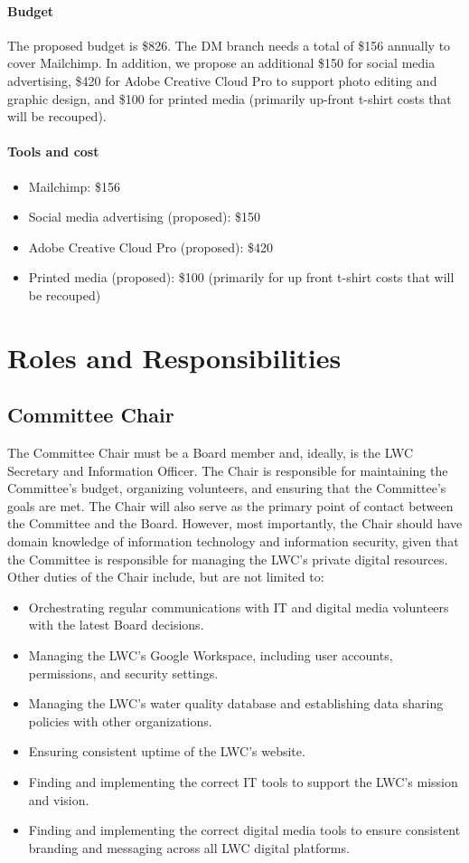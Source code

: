 \documentclass[letterpaper,11pt,leqno]{article}
\begin{document}
\paragraph{Budget} The proposed budget is \$826. The DM branch needs a total of \$156 annually to cover Mailchimp. In addition, we propose an additional \$150 for social media advertising,
\$420 for Adobe Creative Cloud Pro to support photo editing and graphic design, and \$100 for printed media (primarily up-front t-shirt costs that will be recouped).
\paragraph{Tools and cost}
\begin{itemize}
    \item Mailchimp: \$156
    \item Social media advertising (proposed): \$150
    \item Adobe Creative Cloud Pro (proposed): \$420
    \item Printed media (proposed): \$100 (primarily for up front t-shirt costs that will be recouped)
\end{itemize}

\section{Roles and Responsibilities}\label{s:roles}

\subsection{Committee Chair}\label{s:chair}

The Committee Chair must be a Board member and, ideally, is the LWC Secretary and Information Officer. The Chair is responsible for maintaining the Committee's budget, organizing volunteers, and ensuring that the Committee's goals are met. The Chair will also serve as the primary point of contact between the Committee and the Board. However,
most importantly, the Chair should have domain knowledge of information technology and information security, given that the Committee is responsible for managing the LWC's private digital resources. Other duties of the Chair include, but are not limited to:
\begin{itemize}
\item Orchestrating regular communications with IT and digital media volunteers with the latest Board decisions.
\item Managing the LWC's Google Workspace, including user accounts, permissions, and security settings.
\item Managing the LWC's water quality database and establishing data sharing policies with other organizations.
\item Ensuring consistent uptime of the LWC's website.
\item Finding and implementing the correct IT tools to support the LWC's mission and vision.
\item Finding and implementing the correct digital media tools to ensure consistent branding and messaging across all LWC digital platforms.
\end{itemize}
\end{document}
